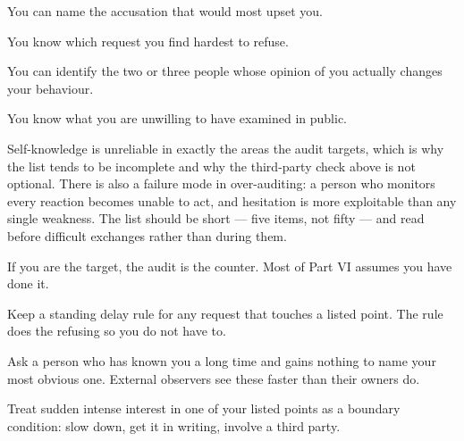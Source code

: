 \begin{feedback}
  \item You can name the accusation that would most upset you.
  \item You know which request you find hardest to refuse.
  \item You can identify the two or three people whose opinion of you actually changes your behaviour.
  \item You know what you are unwilling to have examined in public.
\end{feedback}

\begin{failure}
Self-knowledge is unreliable in exactly the areas the audit targets, which is why the list tends to be incomplete and why the third-party check above is not optional. There is also a failure mode in over-auditing: a person who monitors every reaction becomes unable to act, and hesitation is more exploitable than any single weakness. The list should be short --- five items, not fifty --- and read before difficult exchanges rather than during them.
\end{failure}

\begin{countermeasures}
  \item If you are the target, the audit is the counter. Most of Part VI assumes you have done it.
  \item Keep a standing delay rule for any request that touches a listed point. The rule does the refusing so you do not have to.
  \item Ask a person who has known you a long time and gains nothing to name your most obvious one. External observers see these faster than their owners do.
  \item Treat sudden intense interest in one of your listed points as a boundary condition: slow down, get it in writing, involve a third party.
\end{countermeasures}

\seesources
{}
